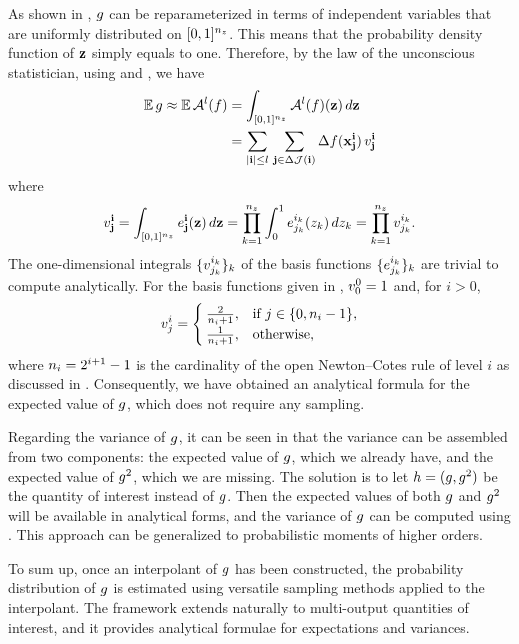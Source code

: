 As shown in , $g$ can be reparameterized in terms of
independent variables that are uniformly distributed on $[0, 1]^{n_z}$. This means
that the probability density function of $\mathbf{z}$ simply equals to one. Therefore,
by the law of the unconscious statistician, using  and
, we have
\begin{align*}
  \mathbb{E} \, g \approx \mathbb{E} \, \mathcal{A}^{l}(f) &= \int_{[0, 1]^{n_z}} \mathcal{A}^{l}(f)(\mathbf{z}) \, d\mathbf{z} \\
  &= \sum_{|\mathbf{i}| \leq l} \, \sum_{\mathbf{j} \in \Delta\mathcal{J}(\mathbf{i})} \Delta f(\mathbf{x}^{\mathbf{i}}_{\mathbf{j}}) \, v^{\mathbf{i}}_{\mathbf{j}}
\end{align*}
where
\[
  v^{\mathbf{i}}_{\mathbf{j}} = \int_{[0, 1]^{n_z}} e^{\mathbf{i}}_{\mathbf{j}}(\mathbf{z}) \, d\mathbf{z} = \prod_{k = 1}^{{n_z}} \int_0^1 e^{i_k}_{j_k}(z_k) \, dz_k = \prod_{k = 1}^{{n_z}} v^{i_k}_{j_k}.
\]
The one-dimensional integrals $\{ v^{i_k}_{j_k} \}_k$ of the basis functions
$\{ e^{i_k}_{j_k} \}_k$ are trivial to compute analytically. For the basis
functions given in , $v^0_0 = 1$ and, for $i > 0$,
\[
  v^i_j = \begin{cases}
    \frac{2}{n_i + 1}, & \text{if } j \in \{ 0, n_i - 1 \}, \\
    \frac{1}{n_i + 1}, & \text{otherwise},
  \end{cases}
\]
where $n_i = 2^{i + 1} - 1$ is the cardinality of the open Newton--Cotes rule
of level $i$ as discussed in . Consequently, we have
obtained an analytical formula for the expected value of $g$, which does not
require any sampling.

Regarding the variance of $g$, it can be seen in  that the
variance can be assembled from two components: the expected value of $g$, which
we already have, and the expected value of $g^2$, which we are missing. The
solution is to let $h = (g, g^2)$ be the quantity of interest instead of $g$.
Then the expected values of both $g$ and $g^2$ will be available in analytical
forms, and the variance of $g$ can be computed using . This
approach can be generalized to probabilistic moments of higher orders.

To sum up, once an interpolant of $g$ has been constructed, the probability
distribution of $g$ is estimated using versatile sampling methods applied to
the interpolant. The framework extends naturally to multi-output quantities of
interest, and it provides analytical formulae for expectations and variances.
